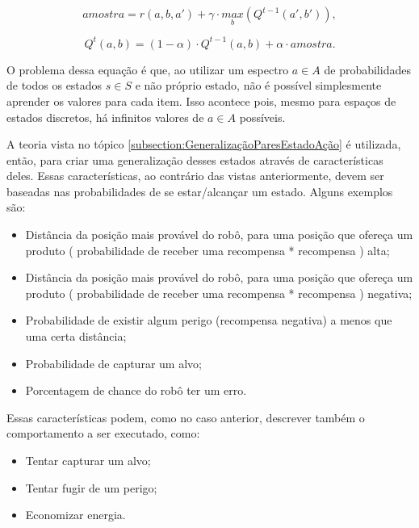 \begin{equation}
	amostra = r \left( a, b, a' \right) + \gamma \cdot \underset{b}{max} \left( Q^{t-1} \left( a', b' \right) \right),
\end{equation}

\begin{equation}
	Q^t \left( a, b \right) = \left( 1 - \alpha \right) \cdot Q^{t-1} \left( a, b \right) + \alpha \cdot amostra.
\end{equation}

O problema dessa equação é que, ao utilizar um espectro $ a \in A $ de probabilidades de todos os estados $ s \in S $ e não próprio estado, não é possível simplesmente aprender os valores para cada item. Isso acontece pois, mesmo para espaços de estados discretos, há infinitos valores de $ a \in A $ possíveis.

A teoria vista no tópico \ref{subsection:GeneralizaçãoParesEstadoAção} é utilizada, então, para criar uma generalização desses estados através de características deles. Essas características, ao contrário das vistas anteriormente, devem ser baseadas nas probabilidades de se estar/alcançar um estado. Alguns exemplos são:

\begin{itemize}
	\item Distância da posição mais provável do robô, para uma posição que ofereça um produto ( probabilidade de receber uma recompensa * recompensa ) alta;
	\item Distância da posição mais provável do robô, para uma posição que ofereça um produto ( probabilidade de receber uma recompensa * recompensa ) negativa;
	\item Probabilidade de existir algum perigo (recompensa negativa) a menos que uma certa distância;
	\item Probabilidade de capturar um alvo;
	\item Porcentagem de chance do robô ter um erro.
\end{itemize}

Essas características podem, como no caso anterior, descrever também o comportamento a ser executado, como:

\begin{itemize}
	\item Tentar capturar um alvo;
	\item Tentar fugir de um perigo;
	\item Economizar energia.
\end{itemize}

